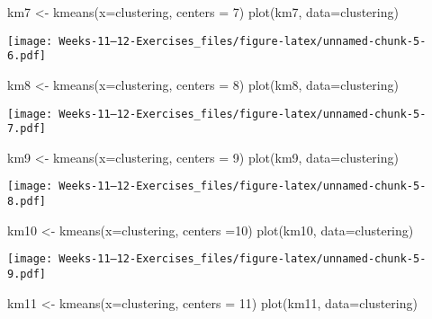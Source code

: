 \documentclass[
]{article}
\newenvironment{Shaded}{\begin{snugshade}}{\end{snugshade}}
\newcommand{\AttributeTok}[1]{\textcolor[rgb]{0.77,0.63,0.00}{#1}}
\newcommand{\DecValTok}[1]{\textcolor[rgb]{0.00,0.00,0.81}{#1}}
\newcommand{\FunctionTok}[1]{\textcolor[rgb]{0.00,0.00,0.00}{#1}}
\newcommand{\NormalTok}[1]{#1}
\newcommand{\OtherTok}[1]{\textcolor[rgb]{0.56,0.35,0.01}{#1}}
\begin{document}
\begin{Shaded}
\begin{Highlighting}[]
\NormalTok{km7 }\OtherTok{\textless{}{-}}  \FunctionTok{kmeans}\NormalTok{(}\AttributeTok{x=}\NormalTok{clustering, }\AttributeTok{centers =} \DecValTok{7}\NormalTok{)}
\FunctionTok{plot}\NormalTok{(km7, }\AttributeTok{data=}\NormalTok{clustering)}
\end{Highlighting}
\end{Shaded}

\texttt{[image: Weeks-11---12-Exercises\_files/figure-latex/unnamed-chunk-5-6.pdf]}

\begin{Shaded}
\begin{Highlighting}[]
\NormalTok{km8 }\OtherTok{\textless{}{-}}  \FunctionTok{kmeans}\NormalTok{(}\AttributeTok{x=}\NormalTok{clustering, }\AttributeTok{centers =} \DecValTok{8}\NormalTok{)}
\FunctionTok{plot}\NormalTok{(km8, }\AttributeTok{data=}\NormalTok{clustering)}
\end{Highlighting}
\end{Shaded}

\texttt{[image: Weeks-11---12-Exercises\_files/figure-latex/unnamed-chunk-5-7.pdf]}

\begin{Shaded}
\begin{Highlighting}[]
\NormalTok{km9 }\OtherTok{\textless{}{-}}  \FunctionTok{kmeans}\NormalTok{(}\AttributeTok{x=}\NormalTok{clustering, }\AttributeTok{centers =} \DecValTok{9}\NormalTok{)}
\FunctionTok{plot}\NormalTok{(km9, }\AttributeTok{data=}\NormalTok{clustering)}
\end{Highlighting}
\end{Shaded}

\texttt{[image: Weeks-11---12-Exercises\_files/figure-latex/unnamed-chunk-5-8.pdf]}

\begin{Shaded}
\begin{Highlighting}[]
\NormalTok{km10 }\OtherTok{\textless{}{-}} \FunctionTok{kmeans}\NormalTok{(}\AttributeTok{x=}\NormalTok{clustering, }\AttributeTok{centers =}\DecValTok{10}\NormalTok{)}
\FunctionTok{plot}\NormalTok{(km10, }\AttributeTok{data=}\NormalTok{clustering)}
\end{Highlighting}
\end{Shaded}

\texttt{[image: Weeks-11---12-Exercises\_files/figure-latex/unnamed-chunk-5-9.pdf]}

\begin{Shaded}
\begin{Highlighting}[]
\NormalTok{km11 }\OtherTok{\textless{}{-}}  \FunctionTok{kmeans}\NormalTok{(}\AttributeTok{x=}\NormalTok{clustering, }\AttributeTok{centers =} \DecValTok{11}\NormalTok{)}
\FunctionTok{plot}\NormalTok{(km11, }\AttributeTok{data=}\NormalTok{clustering)}
\end{Highlighting}
\end{Shaded}
\end{document}

